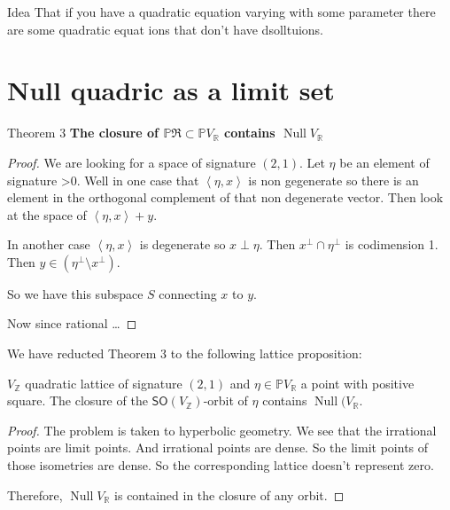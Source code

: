 \begin{thing1}{Idea}\leavevmode
	That if you have a quadratic equation varying with some parameter there are some quadratic equat ions that don't have dsolltuions.
\end{thing1}

\section{Null quadric as a limit set}

\begin{thing3}{Theorem 3}\leavevmode
	\textbf{The closure of $\mathbb{P}\mathfrak{R}\subset \mathbb{P}V_\mathbb{R}$ contains $\operatorname{N u l l}V_{\mathbb{R}}$} 
\end{thing3}

\begin{proof}\leavevmode
	We are looking for a space of signature $(2,1)$. Let  $\eta$ be an element of signature >0. Well in one case that $\left<\eta,x\right> $ is non gegenerate so there is an element in the orthogonal complement of that non degenerate vector. Then look at the space of $\left<\eta,x\right> +y$.

	In another case $\left<\eta,x\right> $ is degenerate so $x\perp \eta$. Then $x^\perp \cap \eta^\perp$ is codimension 1. Then $y\in(\eta^\perp \setminus x^\perp )$.

	So we have this subspace $S$ connecting $ x$ to $y$.

	Now since rational …
\end{proof}

We have reducted Theorem 3 to the following lattice proposition:

\begin{prop}\leavevmode
	$V_\mathbb{Z}$ quadratic lattice of signature $(2,1)$ and  $\eta\in\mathbb{P}V_\mathbb{R}$ a point with positive square. The closure of the $\mathsf{SO}(V_\mathbb{Z})$-orbit of $\eta$ contains $\operatorname{Nu ll}(V_{\mathbb{R}}$. 
\end{prop}

\begin{proof}\leavevmode
	The problem is taken to hyperbolic geometry. {\color{8}We see that the irrational points are limit points.} And irrational points are dense. So the limit points of those isometries are dense. So the corresponding lattice doesn't represent zero.

	Therefore, $\operatorname{Nul l}V_{\mathbb{R}}$ is contained in the closure of any orbit.
\end{proof}


